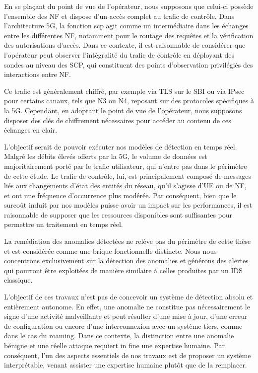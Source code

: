 \documentclass[a4paper,11pt,twoside]{StyleThese}
\begin{document}
En se plaçant du point de vue de l’opérateur, nous supposons que celui-ci possède l’ensemble des NF et dispose d’un accès complet au trafic de contrôle. Dans l’architecture 5G, la fonction \gls{scp} agit comme un intermédiaire dans les échanges entre les différentes NF, notamment pour le routage des requêtes et la vérification des autorisations d’accès. Dans ce contexte, il est raisonnable de considérer que l’opérateur peut observer l’intégralité du trafic de contrôle en déployant des sondes au niveau des SCP, qui constituent des points d’observation privilégiés des interactions entre NF. 

Ce trafic est généralement chiffré, par exemple via TLS sur le SBI ou via IPsec pour certains canaux, tels que N3 ou N4, reposant sur des protocoles spécifiques à la 5G. Cependant, en adoptant le point de vue de l’opérateur, nous supposons disposer des clés de chiffrement nécessaires pour accéder au contenu de ces échanges en clair.

L’objectif serait de pouvoir exécuter nos modèles de détection en temps réel. Malgré les débits élevés offerts par la 5G, le volume de données est majoritairement porté par le trafic utilisateur, qui n’entre pas dans le périmètre de cette étude. Le trafic de contrôle, lui, est principalement composé de messages liés aux changements d’état des entités du réseau, qu’il s’agisse d’UE ou de NF, et ont une fréquence d’occurrence plus modérée. Par conséquent, bien que le surcoût induit par nos modèles puisse avoir un impact sur les performances, il est raisonnable de supposer que les ressources disponibles sont suffisantes pour permettre un traitement en temps réel.

La remédiation des anomalies détectées ne relève pas du périmètre de cette thèse et est considérée comme une brique fonctionnelle distincte. Nous nous concentrons exclusivement sur la détection des anomalies et générons des alertes qui pourront être exploitées de manière similaire à celles produites par un IDS classique.  %

L’objectif de ces travaux n’est pas de concevoir un système de détection absolu et entièrement autonome. En effet, une anomalie ne constitue pas nécessairement le signe d’une activité malveillante et peut résulter d’une mise à jour, d’une erreur de configuration ou encore d’une interconnexion avec un système tiers, comme dans le cas du roaming. Dans ce contexte, la distinction entre une anomalie bénigne et une réelle attaque requiert in fine une expertise humaine. Par conséquent, l’un des aspects essentiels de nos travaux est de proposer un système interprétable, venant assister une expertise humaine plutôt que de la remplacer.
\end{document}
